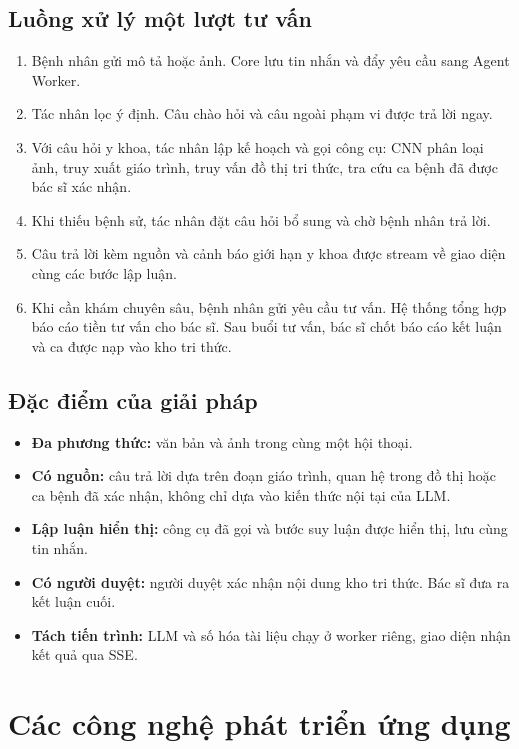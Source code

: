 \subsection{Luồng xử lý một lượt tư vấn}

\begin{enumerate}
  \item Bệnh nhân gửi mô tả hoặc ảnh. Core lưu tin nhắn và đẩy yêu cầu sang Agent Worker.
  \item Tác nhân lọc ý định. Câu chào hỏi và câu ngoài phạm vi được trả lời ngay.
  \item Với câu hỏi y khoa, tác nhân lập kế hoạch và gọi công cụ: CNN phân loại ảnh, truy xuất giáo trình, truy vấn đồ thị tri thức, tra cứu ca bệnh đã được bác sĩ xác nhận.
  \item Khi thiếu bệnh sử, tác nhân đặt câu hỏi bổ sung và chờ bệnh nhân trả lời.
  \item Câu trả lời kèm nguồn và cảnh báo giới hạn y khoa được stream về giao diện cùng các bước lập luận.
  \item Khi cần khám chuyên sâu, bệnh nhân gửi yêu cầu tư vấn. Hệ thống tổng hợp báo cáo tiền tư vấn cho bác sĩ. Sau buổi tư vấn, bác sĩ chốt báo cáo kết luận và ca được nạp vào kho tri thức.
\end{enumerate}

\subsection{Đặc điểm của giải pháp}

\begin{itemize}
  \item \textbf{Đa phương thức:} văn bản và ảnh trong cùng một hội thoại.
  \item \textbf{Có nguồn:} câu trả lời dựa trên đoạn giáo trình, quan hệ trong đồ thị hoặc ca bệnh đã xác nhận, không chỉ dựa vào kiến thức nội tại của LLM.
  \item \textbf{Lập luận hiển thị:} công cụ đã gọi và bước suy luận được hiển thị, lưu cùng tin nhắn.
  \item \textbf{Có người duyệt:} người duyệt xác nhận nội dung kho tri thức. Bác sĩ đưa ra kết luận cuối.
  \item \textbf{Tách tiến trình:} LLM và số hóa tài liệu chạy ở worker riêng, giao diện nhận kết quả qua SSE.
\end{itemize}

\section{Các công nghệ phát triển ứng dụng}

